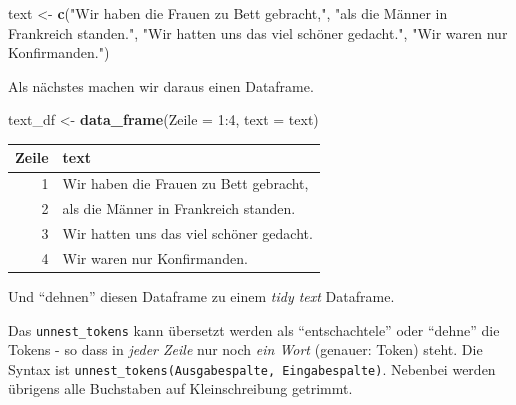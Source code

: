 \documentclass[12pt,]{book}
\makeatletter
\newenvironment{Shaded}{\begin{snugshade}}{\end{snugshade}}
\newcommand{\KeywordTok}[1]{\textcolor[rgb]{0.13,0.29,0.53}{\textbf{{#1}}}}
\newcommand{\DataTypeTok}[1]{\textcolor[rgb]{0.13,0.29,0.53}{{#1}}}
\newcommand{\DecValTok}[1]{\textcolor[rgb]{0.00,0.00,0.81}{{#1}}}
\newcommand{\StringTok}[1]{\textcolor[rgb]{0.31,0.60,0.02}{{#1}}}
\newcommand{\CommentTok}[1]{\textcolor[rgb]{0.56,0.35,0.01}{\textit{{#1}}}}
\newcommand{\NormalTok}[1]{{#1}}
\newenvironment{kframe}{%
\medskip{}
\setlength{\fboxsep}{.8em}
 \def\at@end@of@kframe{}%
 \ifinner\ifhmode%
  \def\at@end@of@kframe{\end{minipage}}%
  \begin{minipage}{\columnwidth}%
 \fi\fi%
 \def\FrameCommand##1{\hskip\@totalleftmargin \hskip-\fboxsep
 \colorbox{shadecolor}{##1}\hskip-\fboxsep
     \hskip-\linewidth \hskip-\@totalleftmargin \hskip\columnwidth}%
 \MakeFramed {\advance\hsize-\width
   \@totalleftmargin\z@ \linewidth\hsize
   \@setminipage}}%
 {\par\unskip\endMakeFramed%
 \at@end@of@kframe}
\renewenvironment{Shaded}{\begin{kframe}}{\end{kframe}}
\makeatother
\begin{document}
\begin{Shaded}
\begin{Highlighting}[]
\NormalTok{text <-}\StringTok{ }\KeywordTok{c}\NormalTok{(}\StringTok{"Wir haben die Frauen zu Bett gebracht,"}\NormalTok{,}
          \StringTok{"als die Männer in Frankreich standen."}\NormalTok{,}
          \StringTok{"Wir hatten uns das viel schöner gedacht."}\NormalTok{,}
          \StringTok{"Wir waren nur Konfirmanden."}\NormalTok{)}
\end{Highlighting}
\end{Shaded}

Als nächstes machen wir daraus einen Dataframe.

\begin{Shaded}
\begin{Highlighting}[]
\NormalTok{text_df <-}\StringTok{ }\KeywordTok{data_frame}\NormalTok{(}\DataTypeTok{Zeile =} \DecValTok{1}\NormalTok{:}\DecValTok{4}\NormalTok{,}
                      \DataTypeTok{text =} \NormalTok{text)}
\end{Highlighting}
\end{Shaded}

\begin{tabular}{r|l}
\hline
Zeile & text\\
\hline
1 & Wir haben die Frauen zu Bett gebracht,\\
\hline
2 & als die Männer in Frankreich standen.\\
\hline
3 & Wir hatten uns das viel schöner gedacht.\\
\hline
4 & Wir waren nur Konfirmanden.\\
\hline
\end{tabular}

Und ``dehnen'' diesen Dataframe zu einem \emph{tidy text} Dataframe.

\begin{Shaded}
\end{Shaded}

Das \texttt{unnest\_tokens} kann übersetzt werden als ``entschachtele''
oder ``dehne'' die Tokens - so dass in \emph{jeder Zeile} nur noch
\emph{ein Wort} (genauer: Token) steht. Die Syntax ist
\texttt{unnest\_tokens(Ausgabespalte,\ Eingabespalte)}. Nebenbei werden
übrigens alle Buchstaben auf Kleinschreibung getrimmt.
\end{document}
